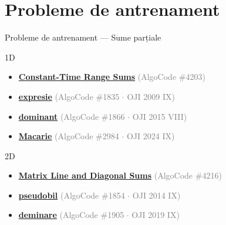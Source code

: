 \documentclass{beamer}
\begin{document}
\section{Probleme de antrenament}

\begin{frame}{Probleme de antrenament — Sume parțiale}
  \begin{block}{1D}
    \begin{itemize}\footnotesize\itemsep0pt
      \item \href{https://code.algolymp.com/problems/4203}{\textbf{Constant-Time Range Sums}} \textcolor{gray}{(AlgoCode \#4203)}
      \item \href{https://code.algolymp.com/problems/1835}{\textbf{expresie}} \textcolor{gray}{(AlgoCode \#1835 $\cdot$ OJI 2009 IX)}
      \item \href{https://code.algolymp.com/problems/1866}{\textbf{dominant}} \textcolor{gray}{(AlgoCode \#1866 $\cdot$ OJI 2015 VIII)}
      \item \href{https://code.algolymp.com/problems/2984}{\textbf{Macarie}} \textcolor{gray}{(AlgoCode \#2984 $\cdot$ OJI 2024 IX)}
    \end{itemize}
  \end{block}
  \vspace{-4pt}
  \begin{block}{2D}
    \begin{itemize}\footnotesize\itemsep0pt
      \item \href{https://code.algolymp.com/problems/4216}{\textbf{Matrix Line and Diagonal Sums}} \textcolor{gray}{(AlgoCode \#4216)}
      \item \href{https://code.algolymp.com/problems/1854}{\textbf{pseudobil}} \textcolor{gray}{(AlgoCode \#1854 $\cdot$ OJI 2014 IX)}
      \item \href{https://code.algolymp.com/problems/1905}{\textbf{deminare}} \textcolor{gray}{(AlgoCode \#1905 $\cdot$ OJI 2019 IX)}
    \end{itemize}
  \end{block}
\end{frame}
\end{document}
